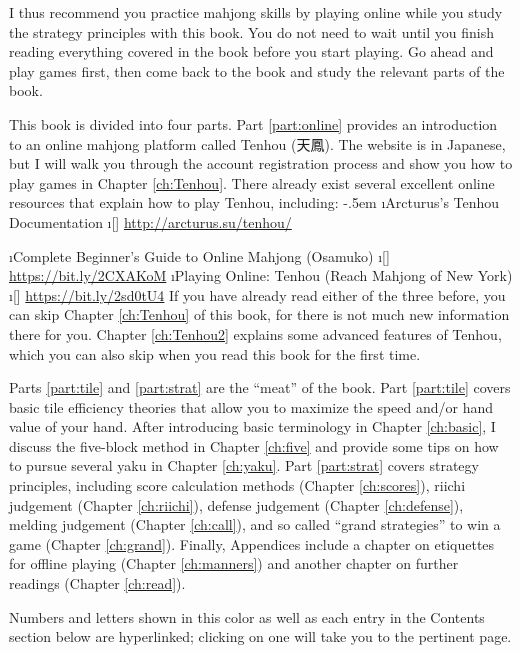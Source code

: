 \bigskip
I thus recommend you practice mahjong skills by playing online while you study the strategy principles with this book. You do not need to wait until you finish reading everything covered in the book before you start playing. Go ahead and play games first, then come back to the book and study the relevant parts of the book. 

\bigskip

This book is divided into four parts. Part \ref{part:online} provides an introduction to an online mahjong platform called {\jap Tenhou} (天鳳). The website is in Japanese, but I will walk you through the account registration process and show you how to play games in Chapter \ref{ch:Tenhou}. There already exist several excellent online resources that explain how to play {\jap Tenhou}, including:
\bi \itemsep-.5em
\i Arcturus's Tenhou Documentation
\vspace{-10pt} 
	\bi
	\i[] \url{http://arcturus.su/tenhou/}
	\ei
	
\i Complete Beginner's Guide to Online Mahjong (Osamuko)
\vspace{-10pt} 
	\bi
	\i[] \url{https://bit.ly/2CXAKoM}
	\ei
\i Playing Online: Tenhou (Reach Mahjong of New York)
\vspace{-10pt}
	\bi \i[] \url{https://bit.ly/2sd0tU4} \ei
\ei
If you have already read either of the three before, you can skip Chapter \ref{ch:Tenhou} of this book, for there is not much new information there for you. Chapter \ref{ch:Tenhou2} explains some advanced features of {\jap Tenhou}, which you can also skip when you read this book for the first time.

\bigskip
Parts \ref{part:tile} and \ref{part:strat} are the ``meat'' of the book. 
Part \ref{part:tile} covers basic tile efficiency theories that allow you to maximize the speed and/or hand value of your hand. After introducing basic terminology in Chapter \ref{ch:basic}, I discuss the five-block method in Chapter \ref{ch:five} and provide some tips on how to pursue several {\jap yaku} in Chapter \ref{ch:yaku}. 
Part \ref{part:strat} covers strategy principles, including score calculation methods (Chapter \ref{ch:scores}), riichi judgement (Chapter \ref{ch:riichi}), defense judgement (Chapter \ref{ch:defense}), melding judgement (Chapter \ref{ch:call}), and so called ``grand strategies'' to win a game (Chapter \ref{ch:grand}). 
Finally, Appendices include a chapter on etiquettes for offline playing (Chapter \ref{ch:manners}) and another chapter on further readings (Chapter \ref{ch:read}). 

\bigskip
Numbers and letters shown {\color{MyBlue} in this color} as well as each entry in the Contents section below are hyperlinked; clicking on one will take you to the pertinent page. 

